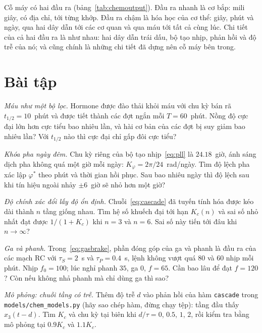 Cỗ máy có hai đầu ra (bảng~\ref{tab:chemoutput}). Đầu ra nhanh là cơ bắp: mili giây, có địa chỉ, tới từng khớp. Đầu ra chậm là hóa học của cơ thể: giây, phút và ngày, qua hai dây dẫn tới các cơ quan và qua máu tới tất cả cùng lúc. Chi tiết của cả hai đầu ra là như nhau: hai dây dẫn trái dấu, bộ tạo nhịp, phản hồi và độ trễ của nó; và cũng chính là những chi tiết đã dựng nên cỗ máy bên trong.

\section{Bài tập}

\begin{exercise}[\lvlA]
\label{ex:16:1}
\emph{Máu như một bộ lọc.} Hormone được đào thải khỏi máu với chu kỳ bán rã $t_{1/2}=10$~phút và được tiết thành các đợt ngắn mỗi $T=60$~phút. Nồng độ cực đại lớn hơn cực tiểu bao nhiêu lần, và hài cơ bản của các đợt bị suy giảm bao nhiêu lần? Với $t_{1/2}$ nào thì cực đại chỉ gấp đôi cực tiểu?
\end{exercise}

\begin{exercise}[\lvlA]
\label{ex:16:2}
\emph{Khóa pha ngày đêm.} Chu kỳ riêng của bộ tạo nhịp~\eqref{eq:pll} là $24.18$~giờ, ánh sáng dịch pha không quá một giờ mỗi ngày: $K_\varphi=2\pi/24$~rad/ngày. Tìm độ lệch pha xác lập $\varphi^*$ theo phút và thời gian hồi phục. Sau bao nhiêu ngày thì độ lệch sau khi tín hiệu ngoài nhảy $\pm6$~giờ sẽ nhỏ hơn một giờ?
\end{exercise}

\begin{exercise}[\lvlB]
\label{ex:16:3}
\emph{Độ chính xác đổi lấy độ ổn định.} Chuỗi~\eqref{eq:cascade} đã tuyến tính hóa được kéo dài thành $n$ tầng giống nhau. Tìm hệ số khuếch đại tới hạn $K_c(n)$ và sai số nhỏ nhất đạt được $1/(1+K_c)$ khi $n=3$ và $n=6$. Sai số này tiến tới đâu khi $n\to\infty$?
\end{exercise}

\begin{exercise}[\lvlB]
\label{ex:16:4}
\emph{Ga và phanh.} Trong~\eqref{eq:gasbrake}, phần đóng góp của ga và phanh là đầu ra của các mạch RC với $\tau_S=2$~s và $\tau_P=0.4$~s, lệnh không vượt quá $80$ và $60$ nhịp mỗi phút. Nhịp $f_0=100$; lúc nghỉ phanh $35$, ga $0$, $f=65$. Cần bao lâu để đạt $f=120$? Còn nếu không nhả phanh mà chỉ dùng ga thì sao?
\end{exercise}

\begin{exercise}[\lvlB]
\label{ex:16:5}
\emph{Mô phỏng: chuỗi tầng có trễ.} Thêm độ trễ $d$ vào phản hồi của hàm \texttt{cascade} trong \texttt{models/\allowbreak chem\_models.py} (hãy sao chép hàm, đừng chạy tệp): tầng đầu thấy $x_3(t-d)$. Tìm $K_c$ và chu kỳ tại biên khi $d/\tau=0$, $0.5$, $1$, $2$, rồi kiểm tra bằng mô phỏng tại $0.9K_c$ và $1.1K_c$.
\end{exercise}

